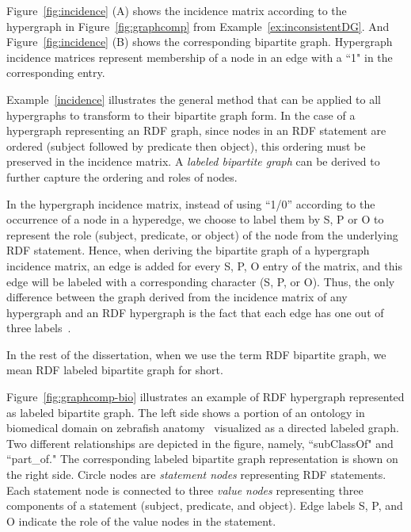 \begin{myexp}
\label{incidence}
Figure~\ref{fig:incidence} (A) shows the incidence matrix according to the hypergraph in Figure~\ref{fig:graphcomp} from Example~\ref{ex:inconsistentDG}. And Figure~\ref{fig:incidence} (B) shows the corresponding bipartite graph. Hypergraph incidence matrices represent membership of a node in an edge with a ``1" in the corresponding entry.
\end{myexp}

Example~\ref{incidence} illustrates the general method that can be applied to all hypergraphs to transform to their bipartite graph form. In the case of a hypergraph representing an RDF graph, since nodes in an RDF statement are ordered (subject followed by predicate then object), this ordering must be preserved in the incidence matrix. A \emph{labeled bipartite graph} can be derived to further capture the ordering and roles of nodes.

\begin{mydef}
In the hypergraph incidence matrix, instead of using ``1/0'' according to the occurrence of a node in a hyperedge, we choose to label them by S, P or O to represent the role (subject, predicate, or object) of the node from the underlying RDF statement. Hence, when deriving the bipartite graph of a hypergraph incidence matrix, an edge is added for every S, P, O entry of the matrix, and this edge will be labeled with a corresponding character (S, P, or O). Thus, the only difference between the graph derived from the incidence matrix of any hypergraph and an RDF hypergraph is the fact that each edge has one out of three labels~\cite{GraphModelRDF}.
\end{mydef}

In the rest of the dissertation, when we use the term RDF bipartite graph, we mean RDF labeled bipartite graph for short.

\begin{myexp}
Figure~\ref{fig:graphcomp-bio} illustrates an example of RDF hypergraph represented as labeled bipartite graph. The left side shows a portion of an ontology in biomedical domain on zebrafish anatomy~\cite{ZFA} visualized as a directed labeled graph. Two different relationships are depicted in the figure, namely, ``subClassOf" and ``part\_of." The corresponding labeled bipartite graph representation is shown on the right side. Circle nodes are \emph{statement nodes} representing RDF statements. Each statement node is connected to three \emph{value nodes} representing three components of a statement (subject, predicate, and object). Edge labels S, P, and O indicate the role of the value nodes in the statement.
\end{myexp}

